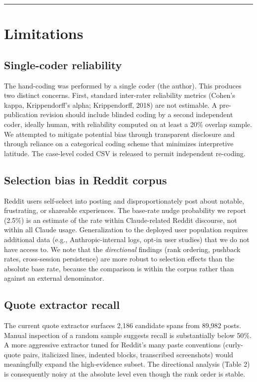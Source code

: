 \documentclass{obelus-preprint}
\begin{document}
\bigskip\hrule\bigskip
\section{Limitations}
\subsection{Single-coder reliability}
The hand-coding was performed by a single coder (the author). This produces two distinct concerns. First, standard inter-rater reliability metrics (Cohen's kappa, Krippendorff's alpha; Krippendorff, 2018) are not estimable. A pre-publication revision should include blinded coding by a second independent coder, ideally human, with reliability computed on at least a 20\% overlap sample. We attempted to mitigate potential bias through transparent disclosure and through reliance on a categorical coding scheme that minimizes interpretive latitude. The case-level coded CSV is released to permit independent re-coding.
\subsection{Selection bias in Reddit corpus}
Reddit users self-select into posting and disproportionately post about notable, frustrating, or shareable experiences. The base-rate nudge probability we report (2.5\%) is an estimate of the rate within Claude-related Reddit discourse, not within all Claude usage. Generalization to the deployed user population requires additional data (e.g., Anthropic-internal logs, opt-in user studies) that we do not have access to. We note that the \emph{directional} findings (rank ordering, pushback rates, cross-session persistence) are more robust to selection effects than the absolute base rate, because the comparison is within the corpus rather than against an external denominator.
\subsection{Quote extractor recall}
The current quote extractor surfaces 2,186 candidate spans from 89,982 posts. Manual inspection of a random sample suggests recall is substantially below 50\%. A more aggressive extractor tuned for Reddit's many paste conventions (curly-quote pairs, italicized lines, indented blocks, transcribed screenshots) would meaningfully expand the high-evidence subset. The directional analysis (Table 2) is consequently noisy at the absolute level even though the rank order is stable.
\end{document}
